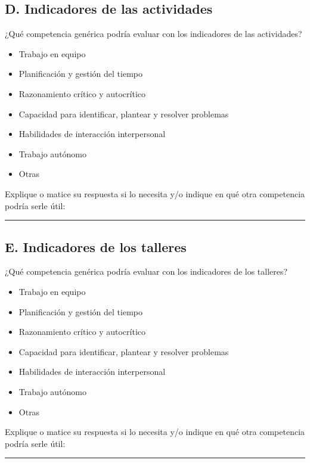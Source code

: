 	\subsection*{D. Indicadores de las actividades}

\begin{mdframed}[style=cuestionarioST]
		¿Qué competencia genérica podría evaluar con los indicadores de las actividades?
			\begin{itemize}
				\item Trabajo en equipo
				\item Planificación y gestión del tiempo
				\item Razonamiento crítico y autocrítico
				\item Capacidad para identificar, plantear y resolver problemas
				\item Habilidades de interacción interpersonal
				\item Trabajo autónomo
				\item Otras
			\end{itemize}
		Explique o matice su respuesta si lo necesita y/o indique en qué otra competencia podría serle útil:\newline
			\rule{120mm}{1pt}
\end{mdframed}

	\subsection*{E. Indicadores de los talleres}

\begin{mdframed}[style=cuestionarioST]
		¿Qué competencia genérica podría evaluar con los indicadores de los talleres?
			\begin{itemize}
				\item Trabajo en equipo
				\item Planificación y gestión del tiempo
				\item Razonamiento crítico y autocrítico
				\item Capacidad para identificar, plantear y resolver problemas
				\item Habilidades de interacción interpersonal
				\item Trabajo autónomo
				\item Otras
			\end{itemize}
		Explique o matice su respuesta si lo necesita y/o indique en qué otra competencia podría serle útil:\newline
			\rule{120mm}{1pt}
\end{mdframed}

